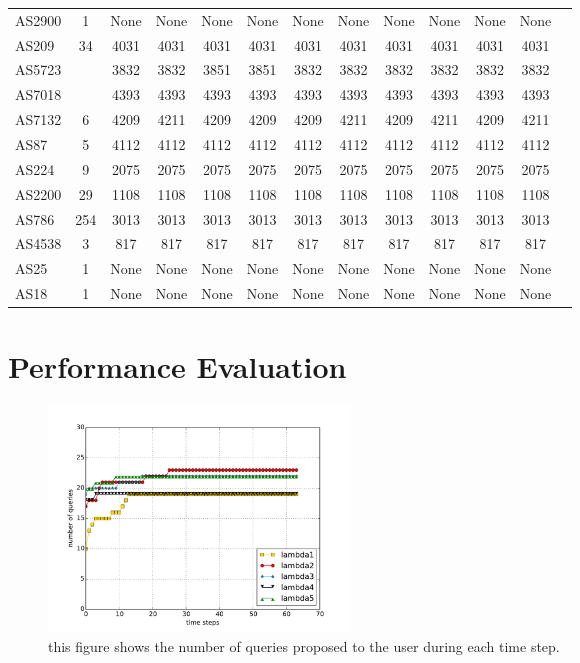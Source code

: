 \documentclass[10pt,journal,compsoc]{IEEEtran}
\begin{document}
\begin{table}[ht]
{\begin{tabular}{lc|cc||cc||cc||cc||cc||c}
AS2900&1  &None & None  &  None&None  & None & None & None & None &None  &None \\
AS209&34 & 4031 &4031  & 4031 & 4031 & 4031 & 4031 & 4031 & 4031 & 4031 &4031 \\
AS5723& &3832  & 3832&  3851 &  3851& 3832 & 3832 & 3832 & 3832 & 3832 &3832 \\
AS7018& & 4393 &4393 & 4393 & 4393 & 4393 & 4393 & 4393 & 4393 &4393  & 4393\\
AS7132&6 &\cellcolor{red!40}4209  &\cellcolor{red!40}4211   & 4209 & 4209 & \cellcolor{red!40}4209  & \cellcolor{red!40}4211 & \cellcolor{red!40}4209 & \cellcolor{red!40}4211 &\cellcolor{green!40}4209  &\cellcolor{green!40}4211 \\
AS87& 5 & 4112&4112 & 4112 & 4112  & 4112 & 4112 & 4112 & 4112 & 4112 &4112 \\
AS224& 9 & 2075&2075   &  2075&  2075& 2075 & 2075 & 2075 & 2075 &2075  & 2075\\
AS2200&29 & 1108& 1108  & 1108 &1108  & 1108 & 1108 & 1108 & 1108 &  1108&1108 \\
AS786& 254 &3013 &3013   & 3013 &3013  & 3013 & 3013 & 3013 & 3013 & 3013 &3013 \\
AS4538& 3  &817&817  &  817&817  & 817 & 817 & 817 & 817 & 817 &817 \\
AS25& 1 &None & None  &None  & None & None & None & None & None & None &None \\
AS18&  1&None & None & None & None & None & None & None & None & None &None \\
\hline
\end{tabular}
}
\end{table}

\section{Performance Evaluation}

\begin{figure}[t]
\includegraphics[width=8cm]{graphs/query-complete}
\caption{this figure shows the number of queries proposed to the user during each time step.}
\centering
\end{figure}
\end{document}
